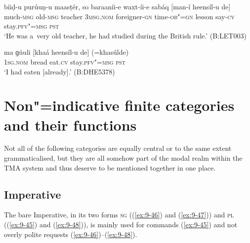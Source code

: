 \begin{exe}
\ex
\label{ex:9-43}
\gll bíiḍ-u purúuṇ-u maasṭér, so baraaníi-e waxt-íi-e sabáq [man-í heensíl-u de] \\
much-\textsc{msg} old-\textsc{msg} teacher 3\textsc{msg.nom}  foreigner-\textsc{gn}
time-\textsc{ob"=gn} lesson say-\textsc{cv} stay.\textsc{pfv"=msg} \textsc{pst} \\
\glt `He was a~very old teacher, he had studied during the British rule.' (B:LET003)

\ex
\label{ex:9-44}
\gll ma ɡúuli [khaá heensíl-u de] (=khasúlde) \\
\textsc{1sg.nom} bread eat.\textsc{cv} stay.\textsc{pfv"=msg} \textsc{pst}  \\
\glt `I had eaten [already].' (B:DHE5378)
\end{exe}

\section{Non"=indicative finite categories and their functions}
\label{sec:9-2}


Not all of the following categories are equally central or to the same extent grammaticalised, but they are all somehow part of the modal realm within the TMA system and thus deserve to be mentioned together in one place.


\subsection{Imperative}
\label{subsec:9-2-1}

The bare Imperative, in its two forms \textsc{sg} ((\ref{ex:9-46}) and (\ref{ex:9-47})) and \textsc{pl (}(\ref{ex:9-45}) and (\ref{ex:9-48})\textsc{)}, is mainly used for commands (\ref{ex:9-45}) and not overly polite requests (\ref{ex:9-46})--(\ref{ex:9-48}).

